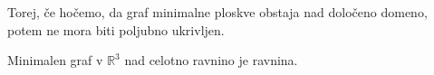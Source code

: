 \documentclass[8pt]{beamer}
\theoremstyle{definition}
\theoremstyle{remark}
\theoremstyle{plain}
\numberwithin{equation}{section}  %
\begin{document}
\begin{frame}
\begin{columns}
\begin{column}{0.5\textwidth}
            
        \end{column}
    \end{columns}
    \pause
    \textcolor{red1}{Torej, če hočemo, da graf minimalne ploskve obstaja nad določeno domeno, potem ne mora biti poljubno ukrivljen.} 
    
    \vspace{0.8em}

    Minimalen graf v $\mathbb{R}^3$ nad celotno ravnino je ravnina. 

\end{frame}
\end{document}
